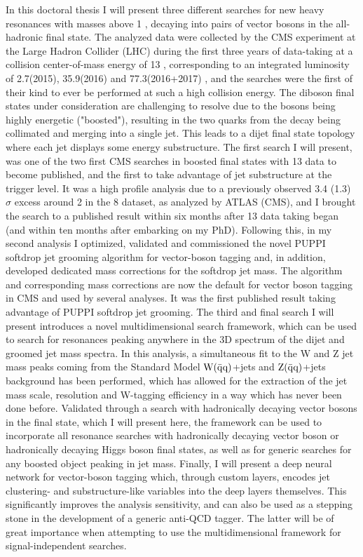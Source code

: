 \small
\noindent In this doctoral thesis I will present three different searches for new heavy resonances with masses above 1 \TeV, decaying into pairs of vector bosons in the all-hadronic final state. The analyzed data were collected by the CMS experiment at the Large Hadron Collider (LHC) during the first three years of data-taking at a collision center-of-mass energy of 13 \TeV, corresponding to an integrated luminosity of 2.7(2015), 35.9(2016) and 77.3(2016+2017) \fbinv, and the searches were the first of their kind to ever be performed at such a high collision energy. The diboson final states under consideration are challenging to resolve due to the bosons being highly energetic ("boosted"), resulting in the two quarks from the decay being collimated and merging into a single jet. This leads to a dijet final state topology where each jet displays some energy substructure. The first search I will present, was one of the two first CMS searches in boosted final states with 13 \TeV data to become published, and the first to take advantage of jet substructure at the trigger level. It was a high profile analysis due to a previously observed 3.4 (1.3) $\sigma$ excess around 2 \TeV in the 8 \TeV dataset, as analyzed by ATLAS (CMS), and I brought the search to a published result within six months after 13 \TeV data taking began (and within ten months after embarking on my PhD). Following this, in my second analysis I optimized, validated and commissioned the novel PUPPI softdrop jet grooming algorithm for vector-boson tagging and, in addition, developed dedicated mass corrections for the softdrop jet mass. The algorithm and corresponding mass corrections are now the default for vector boson tagging in CMS and used by several analyses. It was the first published result taking advantage of PUPPI softdrop jet grooming. The third and final search I will present introduces a novel multidimensional search framework, which can be used to search for resonances peaking anywhere in the 3D spectrum of the dijet and groomed jet mass spectra. In this analysis, a simultaneous fit to the W and Z jet mass peaks coming from the Standard Model $\mathrm{W}(\bar{\rm{q}}\rm{q})$+jets and $\mathrm{Z}(\bar{\rm{q}}\rm{q})$+jets background has been performed, which has allowed for the extraction of the jet mass scale, resolution and W-tagging efficiency in a way which has never been done before. Validated through a search with hadronically decaying vector bosons in the final state, which I will present here, the framework can be used to incorporate all resonance searches with hadronically decaying vector boson or hadronically decaying Higgs boson final states, as well as for generic searches for any boosted object peaking in jet mass. Finally, I will present a deep neural network for vector-boson tagging which, through custom layers, encodes jet clustering- and substructure-like variables into the deep layers themselves. This significantly improves the analysis sensitivity, and can also be used as a stepping stone in the development of a generic anti-QCD tagger. The latter will be of great importance when attempting to use the multidimensional framework for signal-independent searches.